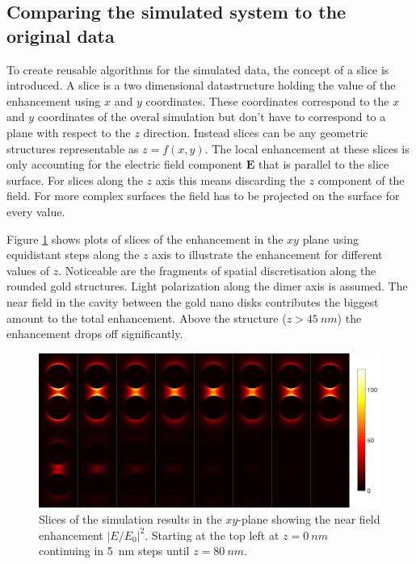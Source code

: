 \subsection{Comparing the simulated system to the original data}

To create reusable algorithms for the simulated data, the concept of a slice is introduced. A slice is a two dimensional datastructure holding the value of the enhancement using $x$ and $y$ coordinates. These coordinates correspond to the $x$ and $y$ coordinates of the overal simulation but don't have to correspond to a plane with respect to the $z$ direction. Instead slices can be any geometric structures representable as $z=f(x,y)$. The local enhancement at these slices is only accounting for the electric field component $\mathbf{E}$ that is parallel to the slice surface. For slices along the $z$ axis this means discarding the $z$ component of the field. For more complex surfaces the field has to be projected on the surface for every value.

Figure \ref{fig:slices} shows plots of slices of the enhancement in the $xy$ plane using equidistant steps along the $z$ axis to illustrate the enhancement for different values of $z$. Noticeable are the fragments of spatial discretisation along the rounded gold structures. Light polarization along the dimer axis is assumed. The near field in the cavity between the gold nano disks contributes the biggest amount to the total enhancement. Above the structure ($z>\SI{45}{nm}$) the enhancement drops off significantly.

\begin{figure}[!h]
  \includegraphics[width=\textwidth]{./images/simulation-slices.png}
  \caption{Slices of the simulation results in the $x y$-plane showing the near field enhancement $|E/E_0|^2$. Starting at the top left at $z=\SI{0}{nm}$ continuing in \SI{5}{nm} steps until $z=\SI{80}{nm}$.}
  \label{fig:slices}
\end{figure}
